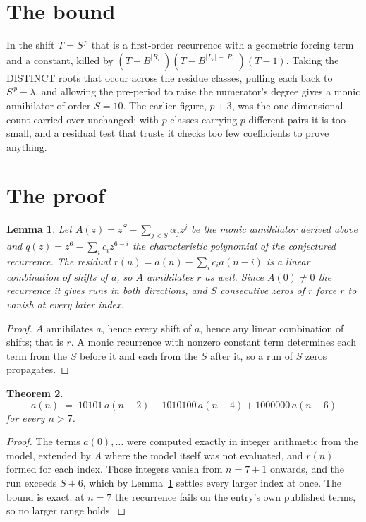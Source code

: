 \documentclass[11pt,a4paper]{article}
\theoremstyle{plain}
\newtheorem{theorem}{Theorem}
\newtheorem{lemma}[theorem]{Lemma}
\theoremstyle{definition}
\begin{document}
\section{The bound}

In the shift $T=S^{\,p}$ that is a first-order recurrence with a geometric forcing term and a
constant, killed by $(T-B^{|R_r|})(T-B^{|L_r|+|R_r|})(T-1)$. Taking the DISTINCT roots that
occur across the residue classes, pulling each back to $S^{\,p}-\lambda$, and allowing the
pre-period to raise the numerator's degree gives a monic annihilator of order $S=10$. The
earlier figure, $p+3$, was the one-dimensional count carried over unchanged; with $p$ classes
carrying $p$ different pairs it is too small, and a residual test that trusts it checks too few
coefficients to prove anything.

\section{The proof}

\begin{lemma}\label{lem:crit}
Let $A(z)=z^S-\sum_{j<S}\alpha_jz^{j}$ be the monic annihilator derived above and
$q(z)=z^{6}-\sum_ic_iz^{6-i}$ the characteristic polynomial of the conjectured
recurrence. The residual $r(n)=a(n)-\sum_ic_ia(n-i)$ is a linear combination of shifts of $a$,
so $A$ annihilates $r$ as well. Since $A(0)\ne0$ the recurrence it gives runs in both
directions, and $S$ consecutive zeros of $r$ force $r$ to vanish at every later index.
\end{lemma}

\begin{proof}
$A$ annihilates $a$, hence every shift of $a$, hence any linear combination of shifts; that is
$r$. A monic recurrence with nonzero constant term determines each term from the $S$ before it
and each from the $S$ after it, so a run of $S$ zeros propagates.
\end{proof}

\begin{theorem}
\[
a(n)\;=\;10101\,a(n-2) - 1010100\,a(n-4) + 1000000\,a(n-6)
\]
for every $n>7$.
\end{theorem}

\begin{proof}
The terms $a(0),\dots$ were computed exactly in integer arithmetic from the model, extended by
$A$ where the model itself was not evaluated, and $r(n)$ formed for each index. Those integers
vanish from $n=7+1$ onwards, and the run exceeds $S+6$, which by
Lemma~\ref{lem:crit} settles every larger index at once. The bound is exact: at $n=7$ the recurrence fails on the entry's own published terms, so no larger range holds.
\end{proof}
\end{document}

